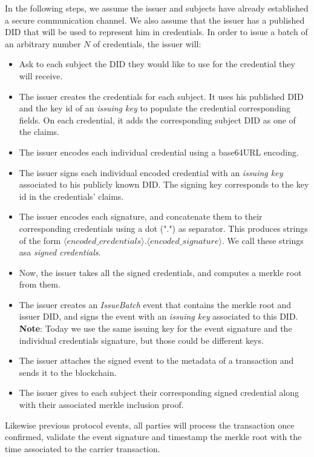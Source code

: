 \documentclass[10pt,a4paper]{article}
\begin{document}
In the following steps, we assume the issuer and subjects have already established a secure communication channel. We also assume that the issuer has
a published DID that will be used to represent him in credentials.
In order to issue a batch of an arbitrary number $N$ of credentials, the issuer will:
\begin{itemize}
\item Ask to each subject the DID they would like to use for the credential they will receive.
\item The issuer creates the credentials for each subject. It uses his published DID and the key id of an \emph{issuing key} to populate
      the credential corresponding fields. On each credential, it adds the corresponding subject DID as one of the claims.
\item The issuer encodes each individual credential using a base64URL encoding.
\item The issuer signs each individual encoded credential with an \emph{issuing key} associated to his publicly known DID. 
      The signing key corresponds to the key id in the credentials' claims.
\item The issuer encodes each signature, and concatenate them to their corresponding credentials using a dot (".") as separator.
      This produces strings of the form $\langle{}encoded\_credentials\rangle{}.\langle{}encoded\_signature\rangle{}$. We call these strings asa
      \emph{signed credentials}.
\item Now, the issuer takes all the signed credentials, and computes a merkle root from them.
\item The issuer creates an \emph{IssueBatch} event that contains the merkle root and issuer DID, and signs the event with an \emph{issuing key} associated to this DID. 
\textbf{Note}: Today we use the same issuing key for the event signature and the individual credentials signature, but those could be different keys.
\item The issuer attaches the signed event to the metadata of a transaction and sends it to the blockchain.
\item The issuer gives to each subject their corresponding signed credential along with their associated merkle inclusion proof.
\end{itemize}

Likewise previous protocol events, all parties will process the transaction once confirmed, validate the event signature and timestamp the merkle root with the time associated to the carrier transaction.
\end{document}

